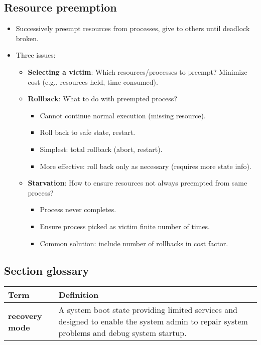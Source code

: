 \subsection{Resource preemption}
\begin{itemize}
    \item Successively preempt resources from processes, give to others until deadlock broken.
    \item Three issues:
    \begin{itemize}
        \item \textbf{Selecting a victim}: Which resources/processes to preempt? Minimize cost (e.g., resources held, time consumed).
        \item \textbf{Rollback}: What to do with preempted process?
        \begin{itemize}
            \item Cannot continue normal execution (missing resource).
            \item Roll back to safe state, restart.
            \item Simplest: total rollback (abort, restart).
            \item More effective: roll back only as necessary (requires more state info).
        \end{itemize}
        \item \textbf{Starvation}: How to ensure resources not always preempted from same process?
        \begin{itemize}
            \item Process never completes.
            \item Ensure process picked as victim finite number of times.
            \item Common solution: include number of rollbacks in cost factor.
        \end{itemize}
    \end{itemize}
\end{itemize}

\subsection*{Section glossary}
\begin{tabular}{p{}p{}}
    \toprule
    \textbf{Term} & \textbf{Definition} \\
    \midrule
    \textbf{recovery mode} & A system boot state providing limited services and designed to enable the system admin to repair system problems and debug system startup. \\
    \bottomrule
\end{tabular}
